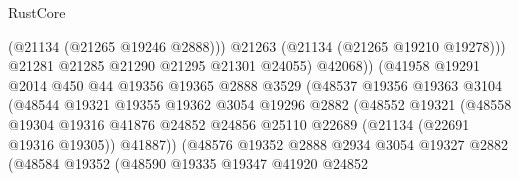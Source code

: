 \begin{lexlean}{RustCore}
\begin{coremodule}
                                          (@21134 (@21265 @19246 @2888)))
                                        @21263
                                        (@21134 (@21265 @19210 @19278)))
                                      @21281
                                      @21285
                                      @21290
                                      @21295
                                      @21301
                                      @24055)
                                    @42068))
                                (@41958
                                  @19291
                                  @2014
                                  @450
                                  @44
                                  @19356
                                  @19365
                                  @2888
                                  @3529
                                  (@48537
                                    @19356
                                    @19363
                                    @3104
                                    (@48544
                                      @19321
                                      @19355
                                      @19362
                                      @3054
                                      @19296
                                      @2882
                                      (@48552
                                        @19321
                                        (@48558
                                          @19304
                                          @19316
                                          @41876
                                          @24852
                                          @24856
                                          @25110
                                          @22689
                                          (@21134 (@22691 @19316 @19305))
                                          @41887))
                                      (@48576
                                        @19352
                                        @2888
                                        @2934
                                        @3054
                                        @19327
                                        @2882
                                        (@48584
                                          @19352
                                          (@48590
                                            @19335
                                            @19347
                                            @41920
                                            @24852

\end{coremodule}
\end{lexlean}
